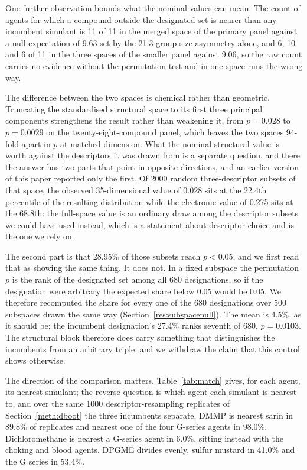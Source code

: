 \documentclass[11pt,a4paper]{article}
\begin{document}
One further observation bounds what the nominal values can mean. The count of
agents for which a compound outside the designated set is nearer than any
incumbent simulant is 11 of 11 in the merged space of the primary panel against
a null expectation of 9.63 set by the 21:3 group-size asymmetry alone, and 6, 10
and 6 of 11 in the three spaces of the smaller panel against 9.06, so the raw
count carries no evidence without the permutation test and in one space runs the
wrong way.


The difference between the two spaces is chemical rather than geometric.
Truncating the standardised structural space to its first three principal
components strengthens the result rather than weakening it, from $p=0.028$ to
$p=0.0029$ on the twenty-eight-compound panel, which leaves the two spaces
94-fold apart in $p$ at matched dimension. What the nominal structural value is
worth against the descriptors it was drawn from is a separate question, and
there the answer has two parts that point in opposite directions, and an earlier
version of this paper reported only the first. Of 2000 random three-descriptor
subsets of that space, the observed 35-dimensional value of 0.028 sits at the
22.4th percentile of the resulting distribution while the electronic value of
0.275 sits at the 68.8th: the full-space value is an ordinary draw among the
descriptor subsets we could have used instead, which is a statement about
descriptor choice and is the one we rely on.

The second part is that 28.95\% of those subsets reach $p<0.05$, and we first
read that as showing the same thing. It does not. In a fixed subspace the
permutation $p$ is the rank of the designated set among all 680 designations, so
if the designation were arbitrary the expected share below 0.05 would be 0.05.
We therefore recomputed the share for every one of the 680 designations over 500
subspaces drawn the same way (Section~\ref{res:subspacenull}). The mean is 4.5\%, as it
should be; the incumbent designation's 27.4\% ranks seventh of 680, $p=0.0103$.
The structural block therefore does carry something that distinguishes the
incumbents from an arbitrary triple, and we withdraw the claim that this control
shows otherwise.


The direction of the comparison matters. Table~\ref{tab:match} gives, for each
agent, its nearest simulant; the reverse question is which agent each simulant
is nearest to, and over the same 1000 descriptor-resampling replicates of
Section~\ref{meth:dboot} the three incumbents separate. DMMP is nearest sarin in
89.8\% of replicates and nearest one of the four G-series agents in 98.0\%.
Dichloromethane is nearest a G-series agent in 6.0\%, sitting instead with the
choking and blood agents. DPGME divides evenly, sulfur mustard in 41.0\% and the
G series in 53.4\%. %
\end{document}
